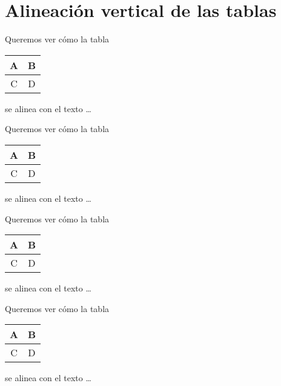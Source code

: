 \documentclass[11pt, a4paper]{article}
\begin{document}
\bigskip
\section{Alineación vertical de las tablas}






\bigskip
%
Queremos ver cómo la tabla  
\begin{tabular}{|c|c|} 
\hline A & B \\ \hline C & D \\ \hline
\end{tabular} 
se alinea con el texto \dots






\bigskip
%
Queremos ver cómo la tabla  
\begin{tabular}[b]{|c|c|} 
\hline A & B \\ \hline C & D \\ \hline
\end{tabular} 
se alinea con el texto \dots







\bigskip

%
Queremos ver cómo la tabla  
\begin{tabular}[t]{|c|c|} 
\hline A & B \\ \hline C & D \\ \hline
\end{tabular} 
se alinea con el texto \dots



\bigskip
Queremos ver cómo la tabla  
\begin{tabular}[t]{|c|c|} 
A & B \\ \hline C & D \\ \hline
\end{tabular} 
se alinea con el texto \dots



\newpage
\end{document}
